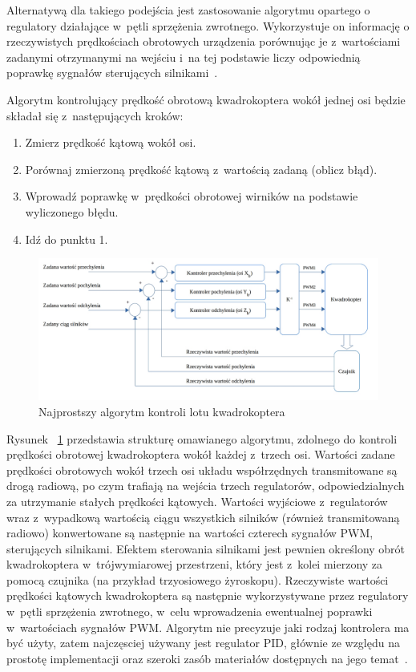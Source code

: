Alternatywą dla takiego podejścia jest zastosowanie algorytmu opartego o regulatory działające w~pętli sprzężenia zwrotnego. Wykorzystuje on informację o rzeczywistych prędkościach obrotowych urządzenia porównując je z~wartościami zadanymi otrzymanymi na wejściu i~na tej podstawie liczy odpowiednią poprawkę sygnałów sterujących silnikami~\cite{quadro9}. 

Algorytm kontrolujący prędkość obrotową kwadrokoptera wokół jednej osi będzie składał się z~następujących kroków:

\begin{enumerate}
	\item Zmierz prędkość kątową wokół osi.
	\item Porównaj zmierzoną prędkość kątową z~wartością zadaną (oblicz błąd).
	\item Wprowadź poprawkę w~prędkości obrotowej wirników na podstawie wyliczonego błędu.
	\item Idź do punktu 1.
\end{enumerate}


\begin{figure}[H]
	\centering
	\includegraphics[width=1.1\textwidth]{Pictures/rate_controll_algorithm2.png}
		\caption[Najprostszy algorytm kontroli lotu kwadrokoptera]{Najprostszy algorytm kontroli lotu kwadrokoptera}
	\label{fig:rate_controll_algorithm}
\end{figure}

Rysunek ~\ref{fig:rate_controll_algorithm} przedstawia strukturę omawianego algorytmu, zdolnego do kontroli prędkości obrotowej kwadrokoptera wokół każdej z~trzech osi. Wartości zadane prędkości obrotowych wokół trzech osi układu współrzędnych transmitowane są drogą radiową, po czym trafiają na wejścia trzech regulatorów, odpowiedzialnych za utrzymanie stałych prędkości kątowych. Wartości wyjściowe z~regulatorów wraz z~wypadkową wartością ciągu wszystkich silników (również transmitowaną radiowo) konwertowane są następnie na wartości czterech sygnałów PWM, sterujących silnikami. Efektem sterowania silnikami jest pewnien określony obrót kwadrokoptera w~trójwymiarowej przestrzeni, który jest z~kolei mierzony za pomocą czujnika (na przykład trzyosiowego żyroskopu). Rzeczywiste wartości prędkości kątowych kwadrokoptera są następnie wykorzystywane przez regulatory w~pętli sprzężenia zwrotnego, w~celu wprowadzenia ewentualnej poprawki w~wartościach sygnałów PWM. Algorytm nie precyzuje jaki rodzaj kontrolera ma być użyty, zatem najczęsciej używany jest regulator PID, głównie ze względu na prostotę implementacji oraz szeroki zasób materiałów dostępnych na jego temat~\cite{quadro9}.


